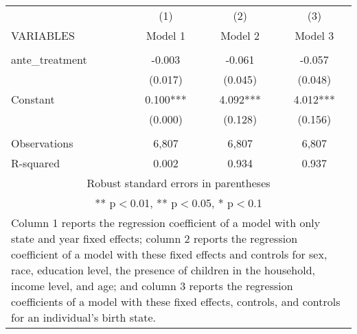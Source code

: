 \begin{tabular}{lccc}
\hline
 & (1) & (2) & (3) \\
VARIABLES & Model 1 & Model 2 & Model 3 \\ \hline
 &  &  &  \\
ante\_treatment & -0.003 & -0.061 & -0.057 \\
 & (0.017) & (0.045) & (0.048) \\
Constant & 0.100*** & 4.092*** & 4.012*** \\
 & (0.000) & (0.128) & (0.156) \\
 &  &  &  \\
Observations & 6,807 & 6,807 & 6,807 \\
 R-squared & 0.002 & 0.934 & 0.937 \\ \hline
\multicolumn{4}{c}{\small Robust standard errors in parentheses} \\
\multicolumn{4}{c}{\small *** p$<$0.01, ** p$<$0.05, * p$<$0.1} \\
\multicolumn{4}{p{0.8\linewidth}}{\small Column 1 reports the
regression coefficient of a model with only state and year fixed effects; column 2 reports the
regression coefficient of a model with these fixed effects and controls for sex, race, education
level, the presence of children in the household, income level, and age; and column 3 reports
the regression coefficients of a model with these fixed effects, controls, and controls for an
individual’s birth state.} \\
\end{tabular}
